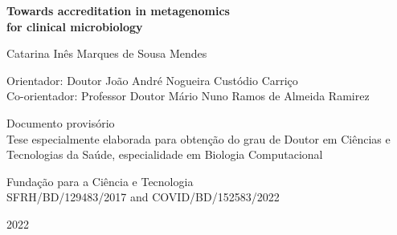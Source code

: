 \begin{titlepage}
\begin{center}
        \vspace{1cm}

        \huge
        \textbf{Towards accreditation in metagenomics \\[1ex] for clinical microbiology}
        \normalsize
        
        \vspace{0.8cm}
        
        \large
        Catarina Inês Marques de Sousa Mendes
        \normalsize
        
        \vspace{0.8cm}
        
        Orientador: Doutor João André Nogueira Custódio Carriço\\
        Co-orientador: Professor Doutor Mário Nuno Ramos de Almeida Ramirez
        
        \vspace{0.8cm}
        
        Documento provisório\\
        Tese especialmente elaborada para obtenção do grau de Doutor em Ciências e Tecnologias da Saúde, especialidade em Biologia Computacional\\
        
        \vspace{0.5cm}
        
        Fundação para a Ciência e Tecnologia \\ 
        SFRH/BD/129483/2017 and COVID/BD/152583/2022
        
        \vspace{0.2cm}
        
        2022
    \end{center}
\end{titlepage}